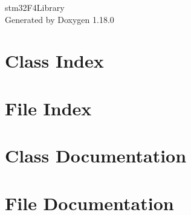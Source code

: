 \documentclass[twoside]{book}
\newcommand{\+}{\discretionary{\mbox{\scriptsize$\hookleftarrow$}}{}{}}
\newcommand{\clearemptydoublepage}{%
    \newpage{\pagestyle{empty}\cleardoublepage}%
  }
\begin{document}
  \raggedbottom
    \hypersetup{pageanchor=false,
                bookmarksnumbered=true,
                pdfencoding=unicode
               }
  \begin{titlepage}
  \vspace*{7cm}
  \begin{center}%
  {\Large stm32\+F4\+Library}\\
  \vspace*{1cm}
  {\large Generated by Doxygen 1.18.0}\\
  \end{center}
  \end{titlepage}
  \clearemptydoublepage
  \tableofcontents
  \clearemptydoublepage
  \hypersetup{pageanchor=true}
\chapter{Class Index}

\chapter{File Index}

\chapter{Class Documentation}


\chapter{File Documentation}






















  \backmatter
  \newpage
  \clearemptydoublepage
  \printindex
\end{document}
